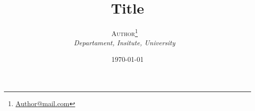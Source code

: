 \documentclass[12pt, a4paper, twocolumn, twoside, english] {article}
\title{Title}
\author{%
\Large\textsc{Author}\thanks{\href{mailto:Author@mail.com}{Author@mail.com} } ~\\[0ex]%
\large \itshape Departament, Insitute, University ~\\[0.5ex] %
}%
\date{\today}%
\begin{document}
%
\pagecolor{yellow!1!orange!3!}%
\maketitle%
\thispagestyle{fancytitle}%
\begin{onehalfspacing}%
%
\printbibliography%
\end{onehalfspacing}%
\end{document}
